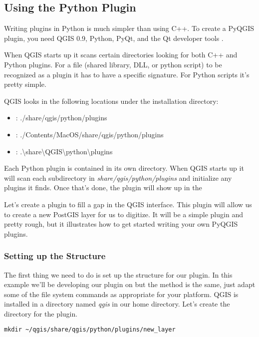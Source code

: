 \subsection{Using the Python Plugin}

Writing plugins in Python is much simpler than using C++.
To create a PyQGIS plugin, you need QGIS 0.9, Python, PyQt, and the Qt developer tools \cite{sherman07}.

When QGIS starts up it scans certain directories looking for both C++ and Python plugins.
For a file (shared library, DLL, or python script) to be recognized as a plugin it has to have a specific signature.
For Python scripts it's pretty simple.

QGIS looks in the following locations under the installation directory:

\begin{itemize}
\item {}: ./share/qgis/python/plugins
\item {}: ./Contents/MacOS/share/qgis/python/plugins
\item {}: .\textbackslash share\textbackslash QGIS\textbackslash python\textbackslash plugins
\end{itemize}

Each Python plugin is contained in its own directory.
When QGIS starts up it will scan each subdirectory in \textsl{share/qgis/python/plugins} and initialize any plugins it finds.
Once that's done, the plugin will show up in the 

Let's create a plugin to fill a gap in the QGIS interface.
This plugin will allow us to create a new PostGIS layer for us to digitize.
It will be a simple plugin and pretty rough, but it illustrates how to get started writing your own PyQGIS plugins.

\subsubsection{Setting up the Structure}
The first thing we need to do is set up the structure for our plugin.
In this example we'll be developing our plugin on  but the method is the same, just adapt some of the file system commands as appropriate for your platform.
QGIS is installed in a directory named \textsl{qgis} in our home directory.
Let's create the directory for the plugin.

\begin{verbatim}
mkdir ~/qgis/share/qgis/python/plugins/new_layer
\end{verbatim}

